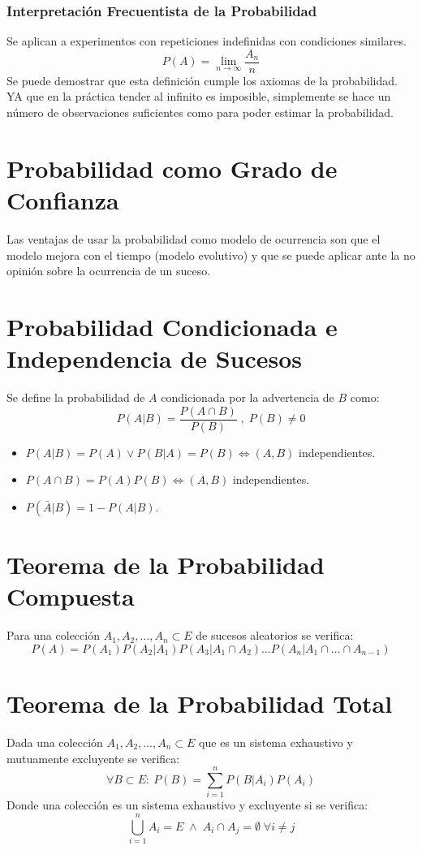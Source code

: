 \documentclass[10pt,a4paper]{book}
\begin{document}
\subsubsection{Interpretación Frecuentista de la Probabilidad}
Se aplican a experimentos con repeticiones indefinidas con condiciones similares.
\[P(A) = \lim_{n\to\infty}\frac{A_n}{n}\]
Se puede demostrar que esta definición cumple los axiomas de la probabilidad. YA que en la práctica tender al infinito es imposible, simplemente se hace un número de observaciones suficientes como para poder estimar la probabilidad.

\section{Probabilidad como Grado de Confianza}
Las ventajas de usar la probabilidad como modelo de ocurrencia son que el modelo mejora con el tiempo (modelo evolutivo) y que se puede aplicar ante la no opinión sobre la ocurrencia de un suceso.

\section{Probabilidad Condicionada e Independencia de Sucesos}
Se define la probabilidad de $A$ condicionada por la advertencia de $B$ como:
\[P(A|B) = \frac{P(A\cap B)}{P(B)}\;,\;P(B)\neq 0\]
\begin{itemize}
	\item $P(A|B) = P(A) \lor P(B|A) = P(B)\iff(A,B)$ independientes.
	\item $P(A\cap B) = P(A)P(B) \iff (A,B)$ independientes.
	\item $P(\bar A|B) = 1-P(A|B)$.
\end{itemize}

\section{Teorema de la Probabilidad Compuesta}
Para una colección $A_1, A_2, \dots, A_n\subset E$ de sucesos aleatorios se verifica:
\[P(A) = P(A_1)P(A_2|A_1)P(A_3|A_1\cap A_2)\dots P(A_n|A_1\cap\dots\cap A_{n-1})\]

\section{Teorema de la Probabilidad Total}
Dada una colección $A_1, A_2, \dots, A_n\subset E$ que es un sistema exhaustivo y mutuamente excluyente se verifica:
\[\forall B\subset E :\: P(B) = \sum_{i=1}^n P(B|A_i)P(A_i)\]
Donde una colección es un sistema exhaustivo y excluyente si se verifica: 
\[\bigcup_{i=1}^n A_i = E\;\land\;A_i\cap A_j = \emptyset\; \forall i\neq j\]
\end{document}
